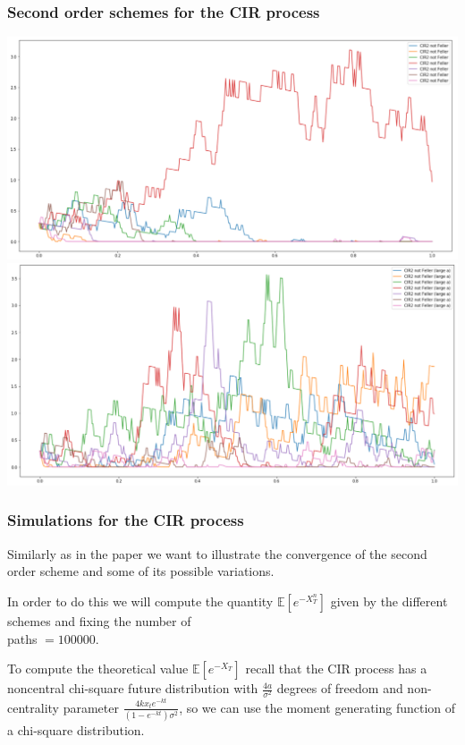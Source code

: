 \documentclass[12pt]{beamer}
\begin{document}
\begin{frame}
	\frametitle{Second order schemes for the CIR process}
	\centering
	\includegraphics[height=0.4\textheight, width=\textwidth]{paths_cir2_not_feller.png}\\
	\includegraphics[height=0.4\textheight, width=\textwidth]{paths_cir2_not_feller_large_a.png}
\end{frame}

\begin{frame}
\frametitle{Simulations for the CIR process}
Similarly as in the paper we want to illustrate the convergence of the second order scheme and some of its possible variations.
\vspace{0.1cm}

In order to do this we will compute the quantity $\mathbb{E}[e^{-X_T^n}]$ given by the different schemes and fixing the number of \\paths $= 100000$.
\vspace{0.3cm}

To compute the theoretical value $\mathbb{E}[e^{-X_T}]$ recall that the CIR process has a noncentral chi-square future distribution with $\frac{4a}{\sigma^2}$ degrees of freedom and non-centrality parameter $\frac{4kx_te^{-kt}}{(1 - e^{-kt})\sigma^2}$, so we can use the moment generating function of a chi-square distribution.

\end{frame}
\end{document}
